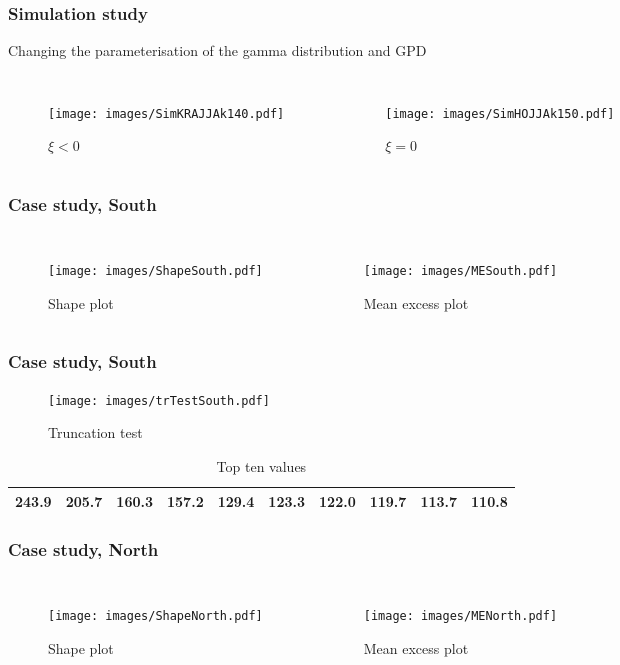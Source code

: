 \documentclass{beamer}
\begin{document}
\begin{frame}
\frametitle{Simulation study}
Changing the parameterisation of the gamma distribution and GPD
\begin{columns}
	\begin{figure}
		\texttt{[image: images/SimKRAJJAk140.pdf]}
		\caption{$\xi < 0$}
	\end{figure}
	\begin{figure}
		\texttt{[image: images/SimHOJJAk150.pdf]}
		\caption{$\xi = 0$}
	\end{figure}
\end{columns}
\end{frame}

\begin{frame}
\frametitle{Case study, South}
\begin{columns}
	\begin{figure}
		\texttt{[image: images/ShapeSouth.pdf]}
		\caption{Shape plot}
	\end{figure}
	\begin{figure}
		\texttt{[image: images/MESouth.pdf]}
		\caption{Mean excess plot}
	\end{figure}	
\end{columns}
\end{frame}

\begin{frame}
\frametitle{Case study, South}
\begin{figure}
	\texttt{[image: images/trTestSouth.pdf]}
	\caption{Truncation test}
\end{figure}
\begin{table}[H]
	\centering
	\tiny
	\begin{tabular}{|c c c c c c c c c c|}
		\hline
		243.9 & 205.7 & 160.3 & 157.2 & 129.4 & 123.3 & 122.0 & 119.7 & 113.7 & 110.8 \\
		\hline
	\end{tabular}
	\caption{Top ten values}
	\label{Top10South}
	\end{table}
\end{frame}

\begin{frame}
\frametitle{Case study, North}
\begin{columns}
	\begin{figure}
		\texttt{[image: images/ShapeNorth.pdf]}
		\caption{Shape plot}
	\end{figure}
	\begin{figure}
		\texttt{[image: images/MENorth.pdf]}
		\caption{Mean excess plot}
	\end{figure}	
\end{columns}
\end{frame}
\end{document}
